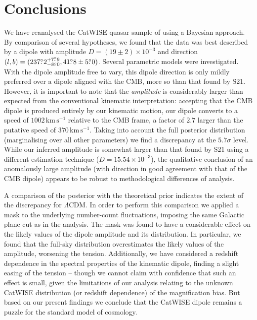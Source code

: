 \documentclass[fleqn,usenatbib]{mnras}
\def\mrm#1{\mathrm{#1}}
\def\LCDM{$\Lambda$CDM}
\def\Dtot{D}
\newcommand{\dotdeg}{\rlap{.}^\circ}
\begin{document}
\section{Conclusions}\label{sec:conclusions}
We have reanalysed the CatWISE quasar sample of \citet[][S21]{2021ApJ...908L..51S} using
a Bayesian approach.
%
By comparison of several hypotheses, we found that the data was best described
by a  dipole with amplitude $\Dtot=(19\pm2)\times10^{-3}$ and direction
$(l,b) = ( 237\dotdeg2^{+7\dotdeg9}_{-8\dotdeg0} , 41\dotdeg8\pm5\dotdeg0)$.
Several parametric models were investigated.
With the dipole amplitude free to vary, this dipole direction is only mildly preferred over
a dipole aligned with the CMB, more so than that found by S21.
However, it is important to note that
the \emph{amplitude} is considerably larger than expected from the conventional kinematic interpretation:
accepting that the CMB dipole is produced entirely by our kinematic motion, our dipole
converts to a speed of $1002\,\mrm{km\,s^{-1}}$ relative to
the CMB frame, a factor of $2.7$ 
larger than the putative speed of $370\,\mrm{km\,s^{-1}}$.
Taking into account the full posterior distribution (marginalising over all other parameters) we find a discrepancy at the $5.7\sigma$ level.
While our inferred amplitude is somewhat larger
than that found by S21 using a different
estimation technique ($\Dtot=15.54\times10^{-3}$),
the qualitative conclusion of an anomalously large amplitude (with
direction in good agreement with that of the CMB dipole) appears to
be robust to methodological differences of analysis.

A comparison of the posterior with the theoretical prior indicates
the extent of the discrepancy for \LCDM.
In order to perform this comparison we
applied a mask to the underlying number-count fluctuations,
imposing the same Galactic plane cut as in the analysis. 
The mask was found to have a considerable effect on the
likely values of the dipole amplitude and its distribution.
In particular, we
found that the full-sky distribution
overestimates the likely values of the amplitude, worsening
the tension.
Additionally, we have considered a redshift dependence in the spectral
properties of the kinematic dipole, finding a slight easing
of the tension -- though we cannot claim with confidence that such an
effect is small, given the limitations of our analysis relating to
the unknown CatWISE distribution (or redshift dependence) of the
magnification bias.
But based on our present findings we conclude that the CatWISE
dipole remains a puzzle for the standard model of cosmology.
\end{document}
